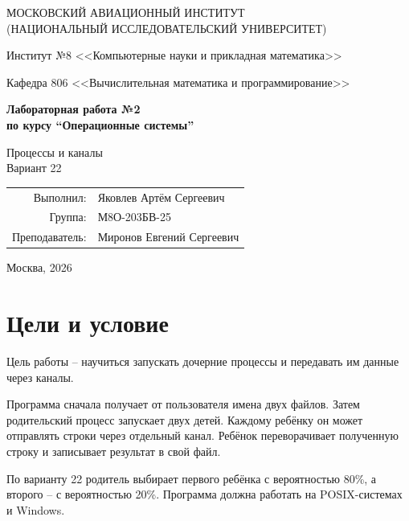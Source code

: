 \documentclass[pdf,unicode,12pt,a4paper,oneside,fleqn]{article}
\newcommand{\StudentName}{Яковлев Артём Сергеевич}
\newcommand{\StudentGroup}{М8О-203БВ-25}
\newcommand{\TeacherName}{Миронов Евгений Сергеевич}
\begin{document}
\begin{titlepage}
\begin{center}
\large
МОСКОВСКИЙ АВИАЦИОННЫЙ ИНСТИТУТ\\
(НАЦИОНАЛЬНЫЙ ИССЛЕДОВАТЕЛЬСКИЙ УНИВЕРСИТЕТ)

\vspace{20pt}
Институт №8 <<Компьютерные науки и прикладная математика>>

Кафедра 806 <<Вычислительная математика и программирование>>
\end{center}

\vspace{60pt}
\begin{center}
\bfseries\large
Лабораторная работа №2\\
по курсу \enquote{Операционные системы}

\vspace{54pt}
Процессы и каналы\\
Вариант 22
\end{center}

\vfill
\begin{flushright}
\large
\begin{tabular}{rl}
Выполнил: & \StudentName \\
Группа: & \StudentGroup \\
Преподаватель: & \TeacherName \\
\end{tabular}
\end{flushright}

\vspace{92pt}
\begin{center}\large Москва, 2026\end{center}
\end{titlepage}
\pagebreak

\section{Цели и условие}
Цель работы -- научиться запускать дочерние процессы и передавать им данные через
каналы\cite{task}.

Программа сначала получает от пользователя имена двух файлов. Затем родительский
процесс запускает двух детей. Каждому ребёнку он может отправлять строки через
отдельный канал. Ребёнок переворачивает полученную строку и записывает результат
в свой файл.

По варианту 22 родитель выбирает первого ребёнка с вероятностью 80\%, а второго --
с вероятностью 20\%. Программа должна
работать на POSIX-системах и Windows.
\end{document}
